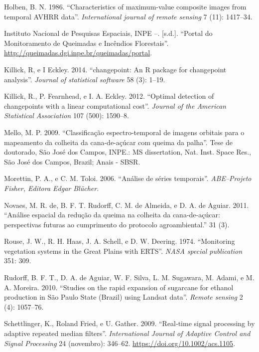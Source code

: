 \documentclass[11pt,brazil,]{article}
\begin{document}
\leavevmode\hypertarget{ref-holben1986characteristics}{}%
Holben, B. N. 1986. ``Characteristics of maximum-value composite images
from temporal AVHRR data''. \emph{International journal of remote
sensing} 7 (11): 1417--34.

\leavevmode\hypertarget{ref-inpe}{}%
Instituto Nacional de Pesquisas Espaciais, INPE --. {[}s.d.{]}. ``Portal
do Monitoramento de Queimadas e Incêndios Florestais''.
\url{http://queimadas.dgi.inpe.br/queimadas/portal}.

\leavevmode\hypertarget{ref-killick2014changepoint}{}%
Killick, R, e I Eckley. 2014. ``changepoint: An R package for
changepoint analysis''. \emph{Journal of statistical software} 58 (3):
1--19.

\leavevmode\hypertarget{ref-killick2012optimal}{}%
Killick, R., P. Fearnhead, e I. A. Eckley. 2012. ``Optimal detection of
changepoints with a linear computational cost''. \emph{Journal of the
American Statistical Association} 107 (500): 1590--8.

\leavevmode\hypertarget{ref-orbitainpe}{}%
Mello, M. P. 2009. ``Classificação espectro-temporal de imagens orbitais
para o mapeamento da colheita da cana-de-açúcar com queima da palha''.
Tese de doutorado, São José dos Campos, INPE.: MS dissertation, Nat.
Inst. Space Res., São José dos Campos, Brazil; Anais - SBSR.

\leavevmode\hypertarget{ref-morettin2006analise}{}%
Morettin, P. A., e C. M. Toloi. 2006. ``Análise de séries temporais''.
\emph{ABE--Projeto Fisher, Editora Edgar Blücher}.

\leavevmode\hypertarget{ref-protocloagro}{}%
Novaes, M. R. de, B. F. T. Rudorff, C. M. de Almeida, e D. A. de Aguiar.
2011. ``Análise espacial da redução da queima na colheita da
cana-de-açúcar: perspectivas futuras ao cumprimento do protocolo
agroambiental.'' 31 (3).

\leavevmode\hypertarget{ref-rouse1974monitoring}{}%
Rouse, J. W., R. H. Haas, J. A. Schell, e D. W. Deering. 1974.
``Monitoring vegetation systems in the Great Plains with ERTS''.
\emph{NASA special publication} 351: 309.

\leavevmode\hypertarget{ref-rudorff2010studies}{}%
Rudorff, B. F. T., D. A. de Aguiar, W. F. Silva, L. M. Sugawara, M.
Adami, e M. A. Moreira. 2010. ``Studies on the rapid expansion of
sugarcane for ethanol production in São Paulo State (Brazil) using
Landsat data''. \emph{Remote sensing} 2 (4): 1057--76.

\leavevmode\hypertarget{ref-medianfilter}{}%
Schettlinger, K., Roland Fried, e U. Gather. 2009. ``Real‐time signal
processing by adaptive repeated median filters''. \emph{International
Journal of Adaptive Control and Signal Processing} 24 (novembro):
346--62. \url{https://doi.org/10.1002/acs.1105}.
\end{document}
